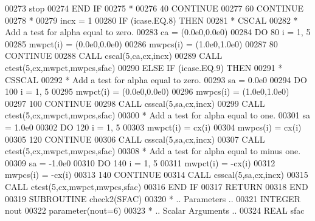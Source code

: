 \begin{DoxyCode}
00273                stop
00274 \textcolor{keywordflow}{            END IF}
00275 \textcolor{comment}{*}
00276    40    \textcolor{keywordflow}{CONTINUE}
00277    60 \textcolor{keywordflow}{CONTINUE}
00278 \textcolor{comment}{*}
00279       incx = 1
00280       \textcolor{keywordflow}{IF} (icase.EQ.8) \textcolor{keywordflow}{THEN}
00281 \textcolor{comment}{*        CSCAL}
00282 \textcolor{comment}{*        Add a test for alpha equal to zero.}
00283          ca = (0.0e0,0.0e0)
00284          \textcolor{keywordflow}{DO} 80 i = 1, 5
00285             mwpct(i) = (0.0e0,0.0e0)
00286             mwpcs(i) = (1.0e0,1.0e0)
00287    80    \textcolor{keywordflow}{CONTINUE}
00288          \textcolor{keyword}{CALL }cscal(5,ca,cx,incx)
00289          \textcolor{keyword}{CALL }ctest(5,cx,mwpct,mwpcs,sfac)
00290       \textcolor{keywordflow}{ELSE} \textcolor{keywordflow}{IF} (icase.EQ.9) \textcolor{keywordflow}{THEN}
00291 \textcolor{comment}{*        CSSCAL}
00292 \textcolor{comment}{*        Add a test for alpha equal to zero.}
00293          sa = 0.0e0
00294          \textcolor{keywordflow}{DO} 100 i = 1, 5
00295             mwpct(i) = (0.0e0,0.0e0)
00296             mwpcs(i) = (1.0e0,1.0e0)
00297   100    \textcolor{keywordflow}{CONTINUE}
00298          \textcolor{keyword}{CALL }csscal(5,sa,cx,incx)
00299          \textcolor{keyword}{CALL }ctest(5,cx,mwpct,mwpcs,sfac)
00300 \textcolor{comment}{*        Add a test for alpha equal to one.}
00301          sa = 1.0e0
00302          \textcolor{keywordflow}{DO} 120 i = 1, 5
00303             mwpct(i) = cx(i)
00304             mwpcs(i) = cx(i)
00305   120    \textcolor{keywordflow}{CONTINUE}
00306          \textcolor{keyword}{CALL }csscal(5,sa,cx,incx)
00307          \textcolor{keyword}{CALL }ctest(5,cx,mwpct,mwpcs,sfac)
00308 \textcolor{comment}{*        Add a test for alpha equal to minus one.}
00309          sa = -1.0e0
00310          \textcolor{keywordflow}{DO} 140 i = 1, 5
00311             mwpct(i) = -cx(i)
00312             mwpcs(i) = -cx(i)
00313   140    \textcolor{keywordflow}{CONTINUE}
00314          \textcolor{keyword}{CALL }csscal(5,sa,cx,incx)
00315          \textcolor{keyword}{CALL }ctest(5,cx,mwpct,mwpcs,sfac)
00316 \textcolor{keywordflow}{      END IF}
00317       \textcolor{keywordflow}{RETURN}
00318 \textcolor{keyword}{      END}
00319 \textcolor{keyword}{      SUBROUTINE }check2(SFAC)
00320 \textcolor{comment}{*     .. Parameters ..}
00321       \textcolor{keywordtype}{INTEGER}           nout
00322       parameter(nout=6)
00323 \textcolor{comment}{*     .. Scalar Arguments ..}
00324       \textcolor{keywordtype}{REAL}              sfac

\end{DoxyCode}
